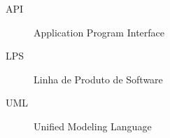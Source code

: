 
\begin{description}
  \item[API] Application Program Interface
  \item[LPS] Linha de Produto de Software
  \item[UML] Unified Modeling Language
\end{description}
